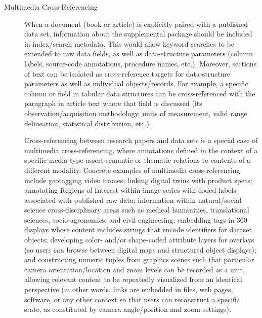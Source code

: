 \documentclass[11pt]{article}
\begin{document}
{{\begin{description}
\item[Multimedia Cross-Referencing]  When a document (book or article) is explicitly paired with a 
published data set, information about the supplemental package should be 
included in index/search metadata.  This would allow 
keyword searches to be extended to raw data fields, as well 
as data-structure parameters (column labels, source-code 
annotations, procedure names, etc.).  Moreover, sections of text 
can be isolated as cross-reference targets for data-structure parameters 
as well as individual objects/records.  For example, a specific 
column or field in tabular data structures can be cross-referenced 
with the paragraph in article text where that field is 
discussed (its observation/acquisition methodology, units of measurement, 
valid range delineation, statistical distribution, etc.).

\pseudoIndent{} Cross-referencing between research papers and data sets 
is a special case of multimedia cross-referencing, where annotations defined 
in the context of a specific media type assert semantic or thematic 
relations to contents of a different modality.  Concrete examples 
of multimedia cross-referencing include geotagging video frames; linking 
\CAD{} digital twins with product specs; annotating Regions of Interest 
within image series with coded labels associated with published raw data; 
information within natural/social science cross-disciplinary areas such as medical 
humanities, translational sciences, socio-agronomics, and civil engineering;
embedding tags in 360\textdegree{} displays whose content includes 
\URL{} strings that encode identifiers for dataset objects; developing 
color- and/or shape-coded attribute layers for \GIS{} overlays (so users 
can browse between digital maps and structured object 
displays); and constructing numeric tuples from \ThreeD{} graphics scenes 
such that particular camera orientation/location and zoom levels 
can be recorded as a unit, allowing relevant \ThreeD{} content to be 
repeatedly visualized from an identical perspective (in other words, 
links are embedded in \PDF{} files, web pages, software, or any 
other context so that users can reconstruct a specific \ThreeD{} state, 
as constituted by camera angle/position and zoom settings).


\end{description}}}
\end{document}

